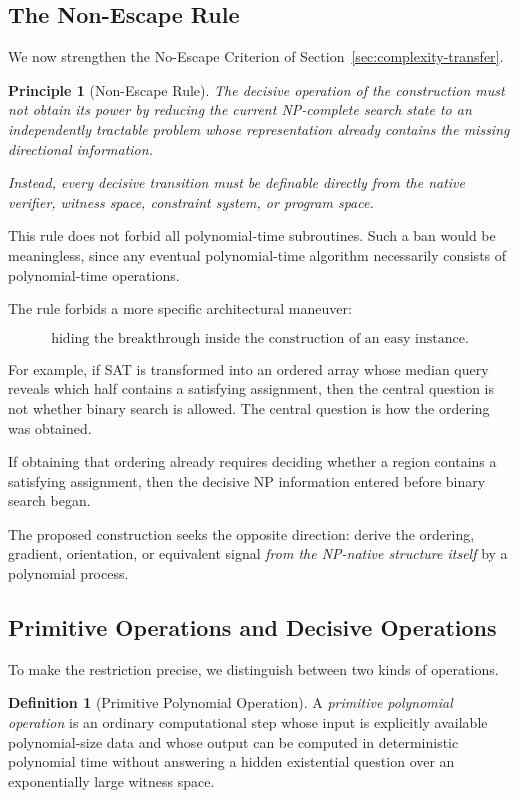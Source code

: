 \documentclass[11pt]{article}
\theoremstyle{plain}
\newtheorem{principle}[theorem]{Principle}
\theoremstyle{definition}
\newtheorem{definition}[theorem]{Definition}
\begin{document}
\subsection{The Non-Escape Rule}

We now strengthen the No-Escape Criterion of
Section~\ref{sec:complexity-transfer}.

\begin{principle}[Non-Escape Rule]
\label{principle:non-escape-rule}
The decisive operation of the construction must not obtain its power by
reducing the current NP-complete search state to an independently tractable
problem whose representation already contains the missing directional
information.

Instead, every decisive transition must be definable directly from the
native verifier, witness space, constraint system, or program space.
\end{principle}

This rule does not forbid all polynomial-time subroutines.  Such a ban would
be meaningless, since any eventual polynomial-time algorithm necessarily
consists of polynomial-time operations.

The rule forbids a more specific architectural maneuver:

\[
\boxed{
\text{hiding the breakthrough inside the construction of an easy instance.}
}
\]

For example, if SAT is transformed into an ordered array whose median query
reveals which half contains a satisfying assignment, then the central question
is not whether binary search is allowed.  The central question is how the
ordering was obtained.

If obtaining that ordering already requires deciding whether a region contains
a satisfying assignment, then the decisive NP information entered before
binary search began.

The proposed construction seeks the opposite direction: derive the ordering,
gradient, orientation, or equivalent signal \emph{from the NP-native
structure itself} by a polynomial process.

\subsection{Primitive Operations and Decisive Operations}

To make the restriction precise, we distinguish between two kinds of
operations.

\begin{definition}[Primitive Polynomial Operation]
A \emph{primitive polynomial operation} is an ordinary computational step
whose input is explicitly available polynomial-size data and whose output can
be computed in deterministic polynomial time without answering a hidden
existential question over an exponentially large witness space.
\end{definition}
\end{document}

